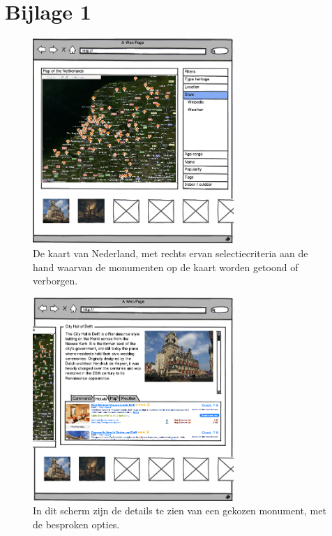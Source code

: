 \documentclass{article}
\begin{document}
\section*{Bijlage 1}
\begin{figure}[h!]
  \centering
  \includegraphics[width=3in]{user-story-overview.png}
  \caption[Het overzichtsscherm]%
  {De kaart van Nederland, met rechts ervan selectiecriteria aan de hand waarvan de monumenten op de kaart worden getoond of verborgen.}
\end{figure}
\begin{figure}[h!]
  \centering
  \includegraphics[width=3in]{user-story-detail.png}
  \caption[Voorbeeld van een detailpagina van een monument]%
  {In dit scherm zijn de details te zien van een gekozen monument, met de besproken opties.}
\end{figure}
\end{document}
